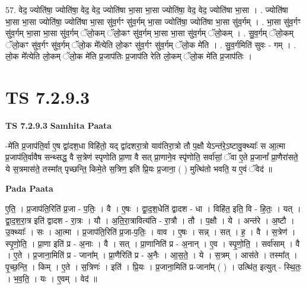 \documentclass[17pt]{extarticle}
\begin{document}
57. वेद॒ ज्योति॑षा॒ ज्योति॑षा॒ वेद॒ वेद॒ ज्योति॑षा भा॒सा भा॒सा ज्योति॑षा॒ वेद॒ वेद॒ ज्योति॑षा भा॒सा । . ज्योति॑षा भा॒सा भा॒सा ज्योति॑षा॒ ज्योति॑षा भा॒सा सु॑व॒र्गꣳ सु॑व॒र्गम् भा॒सा ज्योति॑षा॒ ज्योति॑षा भा॒सा सु॑व॒र्गम् । . भा॒सा सु॑व॒र्गꣳ सु॑व॒र्गम् भा॒सा भा॒सा सु॑व॒र्गम् ॅलो॒कम् ॅलो॒कꣳ सु॑व॒र्गम् भा॒सा भा॒सा सु॑व॒र्गम् ॅलो॒कम् । . सु॒व॒र्गम् ॅलो॒कम् ॅलो॒कꣳ सु॑व॒र्गꣳ सु॑व॒र्गम् ॅलो॒क मे᳚त्येति लो॒कꣳ सु॑व॒र्गꣳ सु॑व॒र्गम् ॅलो॒क मे॑ति । . सु॒व॒र्गमिति॑ सुवः - गम् । . लो॒क मे᳚त्येति लो॒कम् ॅलो॒क मे॑ति प्र॒जाप॑तिः प्र॒जाप॑ति रेति लो॒कम् ॅलो॒क मे॑ति प्र॒जाप॑तिः । \newline
\pagebreak
{}

\section{ TS 7.2.9.3 }

\textbf{TS 7.2.9.3 } \newline
\textbf{Samhita Paata} \newline

-मे॑ति प्र॒जाप॑ति॒र्वा ए॒ष द्वा॑दश॒धा विहि॑तो॒ यद् द्वा॑दशरा॒त्रो याव॑तिरा॒त्रो तौ प॒क्षौ येऽन्त॑रे॒ऽष्टावु॒क्थ्याः᳚ स आ॒त्मा प्र॒जाप॑ति॒र्वावैष सन्थ्सद्ध॒ वै स॒त्रेण॑ स्पृणोति प्रा॒णा वै सत् प्रा॒णाने॒व स्पृ॑णोति॒ सर्वा॑सां॒ ॅवा ए॒ते प्र॒जानां᳚ प्रा॒णैरा॑सते॒ ये स॒त्रमास॑ते॒ तस्मा᳚त् पृच्छन्ति॒ किमे॒ते स॒त्रिण॒ इति॑ प्रि॒यः प्र॒जाना॒ ( ) मुत्थि॑तो भवति॒ य ए॒वं ॅवेद॑ ॥ \newline

\textbf{Pada Paata} \newline

ए॒ति॒ । प्र॒जाप॑ति॒रिति॑ प्र॒जा - प॒तिः॒ । वै । ए॒षः । द्वा॒द॒श॒धेति॑ द्वादश - धा । विहि॑त॒ इति॒ वि - हि॒तः॒ । यत् । द्वा॒द॒श॒रा॒त्र इति॑ द्वादश - रा॒त्रः । यौ । अ॒ति॒रा॒त्रावित्य॑ति - रा॒त्रौ । तौ । प॒क्षौ । ये । अन्त॑रे । अ॒ष्टौ । उ॒क्थ्याः᳚ । सः । आ॒त्मा । प्र॒जाप॑ति॒रिति॑ प्र॒जा-प॒तिः॒ । वाव । ए॒षः । सन्न् । सत् । ह॒ । वै । स॒त्रेण॑ । स्पृ॒णो॒ति॒ । प्रा॒णा इति॑ प्र - अ॒नाः । वै । सत् । प्रा॒णानिति॑ प्र - अ॒नान् । ए॒व । स्पृ॒णो॒ति॒ । सर्वा॑साम् । वै । ए॒ते । प्र॒जाना॒मिति॑ प्र - जाना᳚म् । प्रा॒णैरिति॑ प्र - अ॒नैः । आ॒स॒ते॒ । ये । स॒त्रम् । आस॑ते । तस्मा᳚त् । पृ॒च्छ॒न्ति॒ । किम् । ए॒ते । स॒त्रिणः॑ । इति॑ । प्रि॒यः । प्र॒जाना॒मिति॑ प्र-जाना᳚म् ( ) । उत्थि॑त॒ इत्युत् - स्थि॒तः॒ । भ॒व॒ति॒ । यः । ए॒वम् । वेद॑ ॥  \newline
\end{document}
